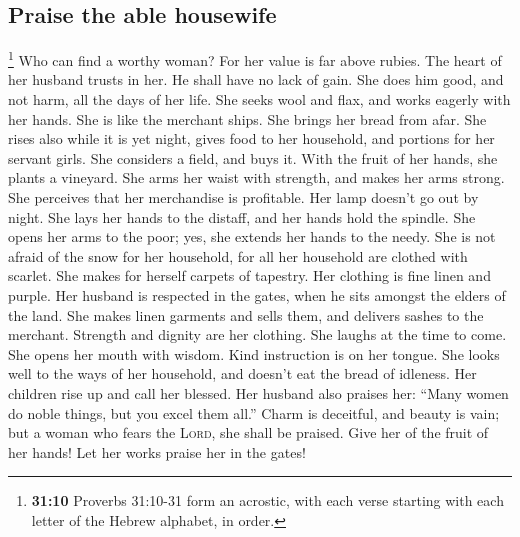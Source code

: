 \hypertarget{praise-the-able-housewife}{%
\subsection{Praise the able housewife}\label{praise-the-able-housewife}}

 \footnote{\textbf{31:10} Proverbs 31:10-31 form an
  acrostic, with each verse starting with each letter of the Hebrew
  alphabet, in order.} Who can find a worthy woman? For her value is far
above rubies.  The heart of her husband trusts in her. He
shall have no lack of gain.  She does him good, and not
harm, all the days of her life.  She seeks wool and flax,
and works eagerly with her hands.  She is like the
merchant ships. She brings her bread from afar.  She
rises also while it is yet night, gives food to her household, and
portions for her servant girls.  She considers a field,
and buys it. With the fruit of her hands, she plants a vineyard.
 She arms her waist with strength, and makes her arms
strong.  She perceives that her merchandise is
profitable. Her lamp doesn't go out by night.  She lays
her hands to the distaff, and her hands hold the spindle.
 She opens her arms to the poor; yes, she extends her
hands to the needy.  She is not afraid of the snow for
her household, for all her household are clothed with scarlet.
 She makes for herself carpets of tapestry. Her clothing
is fine linen and purple.  Her husband is respected in
the gates, when he sits amongst the elders of the land. 
She makes linen garments and sells them, and delivers sashes to the
merchant.  Strength and dignity are her clothing. She
laughs at the time to come.  She opens her mouth with
wisdom. Kind instruction is on her tongue.  She looks
well to the ways of her household, and doesn't eat the bread of
idleness.  Her children rise up and call her blessed. Her
husband also praises her:  ``Many women do noble things,
but you excel them all.''  Charm is deceitful, and beauty
is vain; but a woman who fears the \textsc{Lord}, she shall be praised.
 Give her of the fruit of her hands! Let her works praise
her in the gates!
